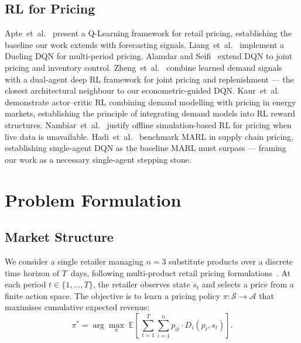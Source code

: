\documentclass[journal, 10pt, twoside]{IEEEtran}
\begin{document}
\subsection{RL for Pricing}

Apte~et~al.~\cite{apte2024} present a Q-Learning framework for retail
pricing, establishing the baseline our work extends with forecasting
signals. Liang~et~al.~\cite{liang2023} implement a Dueling DQN for
multi-period pricing. Alamdar and Seifi~\cite{alamdar2024} extend DQN to
joint pricing and inventory control.
Zheng~et~al.~\cite{zheng2024} combine learned demand signals with a
dual-agent deep RL framework for joint pricing and replenishment --- the
closest architectural neighbour to our econometric-guided DQN.
Kaur~et~al.~\cite{kaur2023}
demonstrate actor--critic RL combining demand modelling with pricing in
energy markets, establishing the principle of integrating demand models
into RL reward structures. Nambiar~et~al.~\cite{nambiar2022} justify
offline simulation-based RL for pricing when live data is unavailable.
Hadi~et~al.~\cite{hadi2025} benchmark MARL in supply chain pricing,
establishing single-agent DQN as the baseline MARL must surpass ---
framing our work as a necessary single-agent stepping stone.

\section{Problem Formulation}
\label{sec:problem}

\subsection{Market Structure}

We consider a single retailer managing $n=3$ substitute products over a
discrete time horizon of $T$~days, following multi-product retail pricing
formulations~\cite{rios2023}. At each period $t \in \{1,\ldots,T\}$,
the retailer observes state $s_t$ and selects a price from a finite
action space. The objective is to learn a pricing policy
$\pi : \mathcal{S} \to \mathcal{A}$ that maximises cumulative expected
revenue:
\begin{equation}
  \pi^* = \arg\max_{\pi}\;
  \mathbb{E}\!\left[\,\sum_{t=1}^{T}\sum_{i=1}^{n} p_{it} \cdot
  D_i(p_t, s_t)\right].
  \label{eq:objective}
\end{equation}
\end{document}
